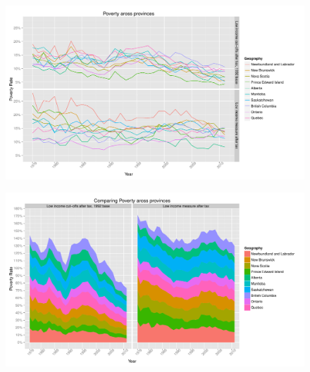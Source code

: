\documentclass{article}\usepackage[]{graphicx}\usepackage[]{color}
\makeatletter
\def\maxwidth{ %
  \ifdim\Gin@nat@width>\linewidth
    \linewidth
  \else
    \Gin@nat@width
  \fi
}
\newenvironment{knitrout}{}{} %
\makeatother
\begin{document}
\begin{figure}[ht]
\begin{center}
\begin{knitrout}
\color{fgcolor}
\includegraphics[width=\maxwidth]{figure/unnamed-chunk-16} 

\end{knitrout}

\end{center}
\end{figure}
\begin{figure}[ht]
\begin{center}
\begin{knitrout}
\color{fgcolor}
\includegraphics[width=\maxwidth]{figure/unnamed-chunk-17} 

\end{knitrout}

\end{center}
\end{figure}
\end{document}
